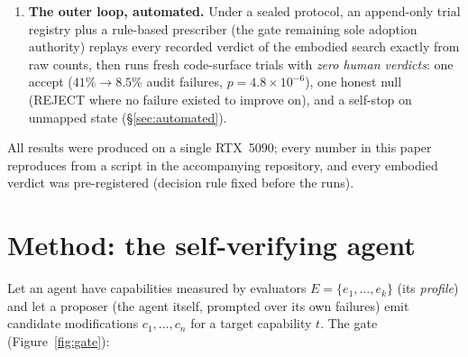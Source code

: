 \documentclass{article}
\begin{document}
\begin{enumerate}
perfectly but collapses globally; head-only training retains best but under-repairs. No recipe passes
both gates at this budget---and across all ten, the gate adopted zero regressions; the capability floor
never dropped (\S\ref{sec:search}).
\item \textbf{The outer loop, automated.} Under a sealed protocol, an append-only trial registry plus a
rule-based prescriber (the gate remaining sole adoption authority) replays every recorded verdict of
the embodied search exactly from raw counts, then runs fresh code-surface trials with \emph{zero human
verdicts}: one accept ($41\%\!\to\!8.5\%$ audit failures, $p=4.8\times10^{-6}$), one honest null
(REJECT where no failure existed to improve on), and a self-stop on unmapped state
(\S\ref{sec:automated}).
\end{enumerate}

All results were produced on a single RTX~5090; every number in this paper reproduces from a script in
the accompanying repository, and every embodied verdict was pre-registered (decision rule fixed before
the runs).

\section{Method: the self-verifying agent}
\label{sec:method}

Let an agent have capabilities measured by evaluators $E=\{e_1,\dots,e_k\}$ (its \emph{profile}) and let
a proposer (the agent itself, prompted over its own failures) emit candidate modifications
$c_1,\dots,c_n$ for a target capability $t$. The gate (Figure~\ref{fig:gate}):
\end{document}
